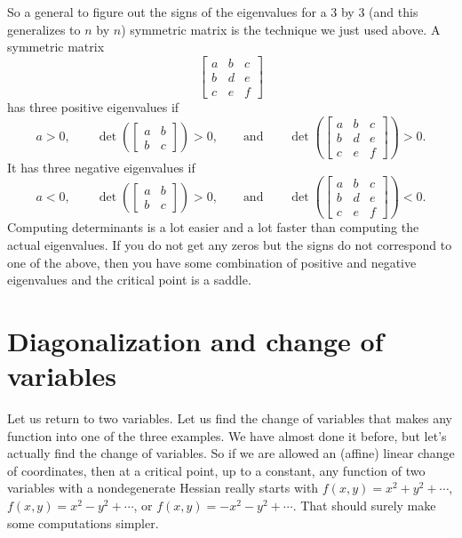 \documentclass[12pt]{article}
\begin{document}
So a general to figure out the signs of the eigenvalues for
a 3 by 3 (and this generalizes to $n$ by $n$) symmetric matrix is
the technique we just used above.
A symmetric matrix
\begin{equation*}
\begin{bmatrix}
a & b & c \\
b & d & e \\
c & e & f
\end{bmatrix}
\end{equation*}
has 
three positive eigenvalues if
\begin{equation*}
a > 0,
\qquad
\det \left(
\begin{bmatrix}
a & b \\
b & c
\end{bmatrix}
\right) > 0 ,
\qquad \text{and} \qquad
\det \left(
\begin{bmatrix}
a & b & c \\
b & d & e \\
c & e & f
\end{bmatrix}
\right) > 0 .
\end{equation*}
It has three negative eigenvalues if
\begin{equation*}
a < 0,
\qquad
\det \left(
\begin{bmatrix}
a & b \\
b & c
\end{bmatrix}
\right) > 0 ,
\qquad \text{and} \qquad
\det \left(
\begin{bmatrix}
a & b & c \\
b & d & e \\
c & e & f
\end{bmatrix}
\right) < 0 .
\end{equation*}
Computing determinants is a lot easier and a lot faster than computing the
actual eigenvalues.
If you do not get any zeros but the signs do not correspond to one of the
above, then you have some combination of positive and negative eigenvalues
and the critical point is a saddle.

\section{Diagonalization and change of variables}

Let us return to two variables.  Let us find the 
change of variables that makes any function into one of the three
examples.  We have almost done it before, but let's actually find
the change of variables.
So if we are allowed an (affine) linear change of coordinates, then at
a critical point, up to a constant, any
function of two variables with a nondegenerate Hessian really starts with
$f(x,y) = x^2+y^2 + \cdots$, 
$f(x,y) = x^2-y^2 + \cdots$, or
$f(x,y) = -x^2-y^2 + \cdots$.
That should surely make some computations simpler.
\end{document}
